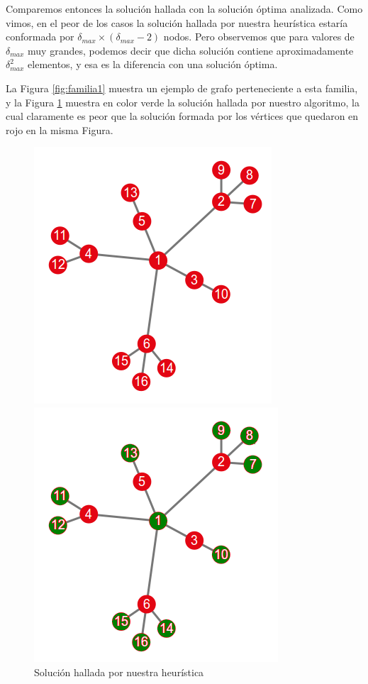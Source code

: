 Comparemos entonces la solución hallada con la solución óptima analizada. Como vimos, en el peor de los casos la solución hallada por nuestra heurística estaría conformada por $\delta_{max} \times (\delta_{max} - 2)$ nodos. Pero observemos que para valores de $\delta_{max}$ muy grandes, podemos decir que dicha solución contiene aproximadamente $\delta_{max}^2$ elementos, y esa es la diferencia con una solución óptima.

La Figura \ref{fig:familia1} muestra un ejemplo de grafo perteneciente a esta familia, y la Figura \ref{fig:familia1res} muestra en color verde la solución hallada por nuestro algoritmo, la cual claramente es peor que la solución formada por los vértices que quedaron en rojo en la misma Figura.

\begin{figure}[!htb]
\begin{center}
  \includegraphics[scale=0.5]{imagenes/familia1.png}
\end{center}
  \caption{Grafo perteneciente a la Familia 1}\label{fig:familia1}
\endminipage\hfill
{}
\begin{center}
  \includegraphics[scale=0.5]{imagenes/familia1-res.png}
\end{center}
  \caption{Solución hallada por nuestra heurística}\label{fig:familia1res}
\endminipage
\end{figure}

